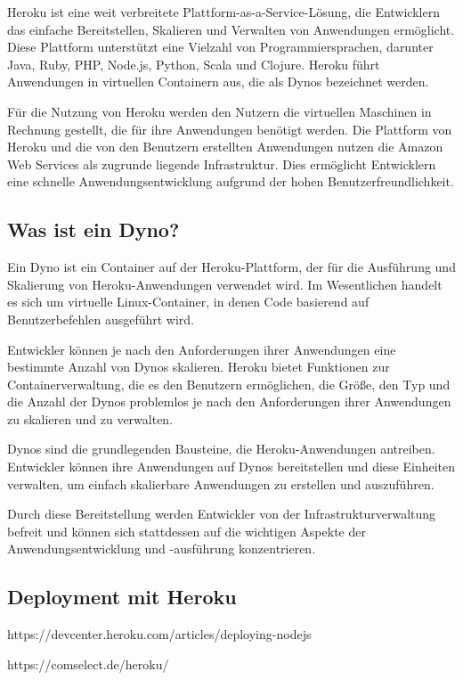 Heroku ist eine weit verbreitete Plattform-as-a-Service-Lösung, die Entwicklern das einfache Bereitstellen, Skalieren und Verwalten von Anwendungen ermöglicht. Diese Plattform unterstützt eine Vielzahl von Programmiersprachen, darunter Java, Ruby, PHP, Node.js, Python, Scala und Clojure. Heroku führt Anwendungen in virtuellen Containern aus, die als Dynos bezeichnet werden.

Für die Nutzung von Heroku werden den Nutzern die virtuellen Maschinen in Rechnung gestellt, die für ihre Anwendungen benötigt werden. Die Plattform von Heroku und die von den Benutzern erstellten Anwendungen nutzen die Amazon Web Services als zugrunde liegende Infrastruktur. Dies ermöglicht Entwicklern eine schnelle Anwendungsentwicklung aufgrund der hohen Benutzerfreundlichkeit.

\subsection{Was ist ein Dyno?}

Ein Dyno ist ein Container auf der Heroku-Plattform, der für die Ausführung und Skalierung von Heroku-Anwendungen verwendet wird. Im Wesentlichen handelt es sich um virtuelle Linux-Container, in denen Code basierend auf Benutzerbefehlen ausgeführt wird.

Entwickler können je nach den Anforderungen ihrer Anwendungen eine bestimmte Anzahl von Dynos skalieren. Heroku bietet Funktionen zur Containerverwaltung, die es den Benutzern ermöglichen, die Größe, den Typ und die Anzahl der Dynos problemlos je nach den Anforderungen ihrer Anwendungen zu skalieren und zu verwalten.

Dynos sind die grundlegenden Bausteine, die Heroku-Anwendungen antreiben. Entwickler können ihre Anwendungen auf Dynos bereitstellen und diese Einheiten verwalten, um einfach skalierbare Anwendungen zu erstellen und auszuführen.

Durch diese Bereitstellung werden Entwickler von der Infrastrukturverwaltung befreit und können sich stattdessen auf die wichtigen Aspekte der Anwendungsentwicklung und -ausführung konzentrieren.

\subsection{Deployment mit Heroku}

https://devcenter.heroku.com/articles/deploying-nodejs

https://comselect.de/heroku/